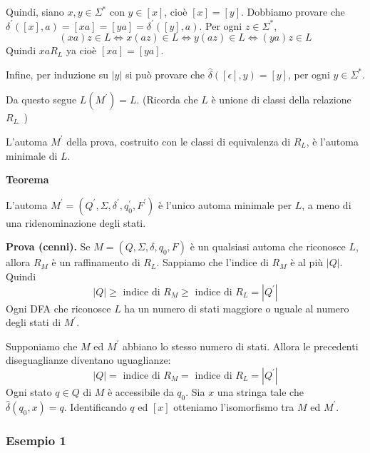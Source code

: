 Quindi, siano $x, y \in \Sigma^{*}$ con $y \in[x]$, cioè $[x]=[y]$. Dobbiamo provare che $\delta^{\prime}([x], a)=[x a]=[y a]=\delta^{\prime}([y], a)$.
Per ogni $z \in \Sigma^{*}$,
$$
(x a) z \in L \Leftrightarrow x(a z) \in L \Leftrightarrow y(a z) \in L \Leftrightarrow(y a) z \in L
$$
Quindi $x a R_{L}$ ya cioè $[x a]=[y a]$.

Infine, per induzione su $|y|$ si può provare che $\hat{\delta}([\epsilon], y)=[y]$, per ogni $y \in \Sigma^{*}$.

Da questo segue $L\left(M^{\prime}\right)=L$. (Ricorda che $L$ è unione di classi della relazione $R_{L .}$ )

L'automa $M^{\prime}$ della prova, costruito con le classi di equivalenza di $R_{L}$, è l'automa minimale di $L$.

\vspace{5mm}

\textbf{Teorema}

L'automa $M^{\prime}=\left(Q^{\prime}, \Sigma, \delta^{\prime}, q_{0}^{\prime}, F^{\prime}\right)$ è l'unico automa minimale per $L$, a meno di una ridenominazione degli stati.

\vspace{5mm}

\textbf{Prova (cenni).} Se $M=\left(Q, \Sigma, \delta, q_{0}, F\right)$ è un qualsiasi automa che riconosce $L$, allora $R_{M}$ è un raffinamento di $R_{L}$. Sappiamo che l'indice di $R_{M}$ è al più $|Q|$. Quindi
$$
|Q| \geq \text { indice di } R_{M} \geq \text { indice di } R_{L}=\left|Q^{\prime}\right|
$$
Ogni DFA che riconosce $L$ ha un numero di stati maggiore o uguale al numero degli stati di $M^{\prime}$.

Supponiamo che $M$ ed $M^{\prime}$ abbiano lo stesso numero di stati. Allora le precedenti diseguaglianze diventano uguaglianze:
$$
|Q|=\text { indice di } R_{M}=\text { indice di } R_{L}=\left|Q^{\prime}\right|
$$
Ogni stato $q \in Q$ di $M$ è accessibile da $q_{0}$.
Sia $x$ una stringa tale che $\hat{\delta}\left(q_{0}, x\right)=q$. Identificando $q$ ed $[x]$ otteniamo l'isomorfismo tra $M$ ed $M^{\prime}$.

\subsubsection{Esempio 1}


